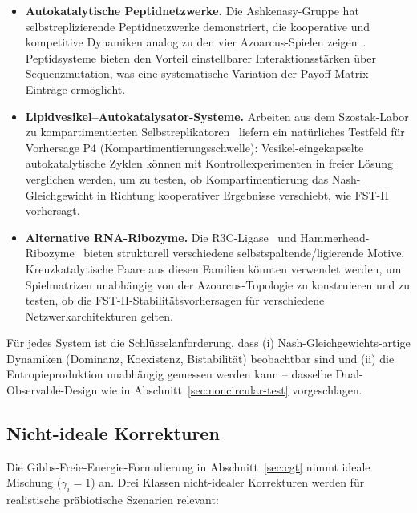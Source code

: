 \documentclass[12pt,a4paper]{article}
\theoremstyle{remark}
\begin{document}
\begin{itemize}
    \item \textbf{Autokatalytische Peptidnetzwerke.} Die Ashkenasy-Gruppe hat selbstreplizierende Peptidnetzwerke demonstriert, die kooperative und kompetitive Dynamiken analog zu den vier Azoarcus-Spielen zeigen~\citep{Ashkenasy2004}. Peptidsysteme bieten den Vorteil einstellbarer Interaktionsstärken über Sequenzmutation, was eine systematische Variation der Payoff-Matrix-Einträge ermöglicht.
    \item \textbf{Lipidvesikel--Autokatalysator-Systeme.} Arbeiten aus dem Szostak-Labor zu kompartimentierten Selbstreplikatoren~\citep{Szostak2001} liefern ein natürliches Testfeld für Vorhersage P4 (Kompartimentierungsschwelle): Vesikel-eingekapselte autokatalytische Zyklen können mit Kontrollexperimenten in freier Lösung verglichen werden, um zu testen, ob Kompartimentierung das Nash-Gleichgewicht in Richtung kooperativer Ergebnisse verschiebt, wie FST-II vorhersagt.
    \item \textbf{Alternative RNA-Ribozyme.} Die R3C-Ligase~\citep{Rogers2001} und Hammerhead-Ribozyme~\citep{Hammerhead1986} bieten strukturell verschiedene selbstspaltende/ligierende Motive. Kreuzkatalytische Paare aus diesen Familien könnten verwendet werden, um Spielmatrizen unabhängig von der Azoarcus-Topologie zu konstruieren und zu testen, ob die FST-II-Stabilitätsvorhersagen für verschiedene Netzwerkarchitekturen gelten.
\end{itemize}

\noindent
Für jedes System ist die Schlüsselanforderung, dass (i) Nash-Gleichgewichts-artige Dynamiken (Dominanz, Koexistenz, Bistabilität) beobachtbar sind und (ii) die Entropieproduktion unabhängig gemessen werden kann -- dasselbe Dual-Observable-Design wie in Abschnitt~\ref{sec:noncircular-test} vorgeschlagen.

\subsection{Nicht-ideale Korrekturen}
\label{sec:nonideal-corrections}

Die Gibbs-Freie-Energie-Formulierung in Abschnitt~\ref{sec:cgt} nimmt ideale Mischung ($\gamma_i = 1$) an. Drei Klassen nicht-idealer Korrekturen werden für realistische präbiotische Szenarien relevant:
\end{document}

